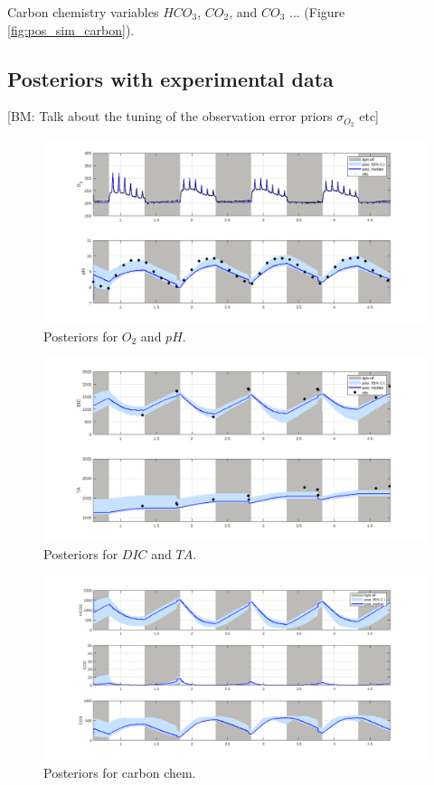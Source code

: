 \documentclass{ruthesis}
\begin{document}
Carbon chemistry variables $HCO_3$, $CO_2$, and $CO_3$ ... (Figure \ref{fig:pos_sim_carbon}).

\FloatBarrier
\subsection{Posteriors with experimental data}

[BM: Talk about the tuning of the observation error priors $\sigma_{O_2}$ etc]


\begin{figure}
	\centerline{\includegraphics[width=1.2\textwidth]{images_microalgae/plots/O2_pH}}
	\caption[.]{Posteriors for $O_2$ and $pH$.}
	\label{fig:pos_O2_pH}
\end{figure}

\begin{figure}
	\centerline{\includegraphics[width=1.2\textwidth]{images_microalgae/plots/DIC_TA}}
	\caption[.]{Posteriors for $DIC$ and $TA$.}
	\label{fig:pos_DIC_TA}
\end{figure}

\begin{figure}
	\centerline{\includegraphics[width=1.2\textwidth]{images_microalgae/plots/carbon}}
	\caption[.]{Posteriors for carbon chem.}
	\label{fig:pos_carbon}
\end{figure}
\end{document}
